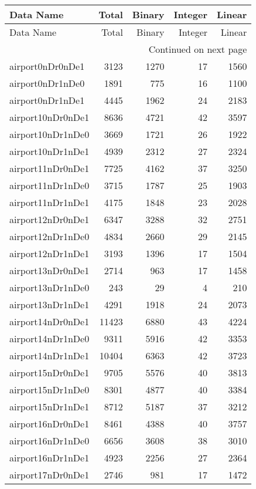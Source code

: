 
\begin{longtable}{lrrrr}
\toprule
Data Name & Total & Binary & Integer & Linear \\
\midrule
\endfirsthead
\toprule
Data Name & Total & Binary & Integer & Linear \\
\midrule
\endhead
\midrule
\multicolumn{5}{r}{Continued on next page} \\
\midrule
\endfoot
\bottomrule
\endlastfoot
airport0nDr0nDe1 & 3123 & 1270 & 17 & 1560 \\
airport0nDr1nDe0 & 1891 & 775 & 16 & 1100 \\
airport0nDr1nDe1 & 4445 & 1962 & 24 & 2183 \\
airport10nDr0nDe1 & 8636 & 4721 & 42 & 3597 \\
airport10nDr1nDe0 & 3669 & 1721 & 26 & 1922 \\
airport10nDr1nDe1 & 4939 & 2312 & 27 & 2324 \\
airport11nDr0nDe1 & 7725 & 4162 & 37 & 3250 \\
airport11nDr1nDe0 & 3715 & 1787 & 25 & 1903 \\
airport11nDr1nDe1 & 4175 & 1848 & 23 & 2028 \\
airport12nDr0nDe1 & 6347 & 3288 & 32 & 2751 \\
airport12nDr1nDe0 & 4834 & 2660 & 29 & 2145 \\
airport12nDr1nDe1 & 3193 & 1396 & 17 & 1504 \\
airport13nDr0nDe1 & 2714 & 963 & 17 & 1458 \\
airport13nDr1nDe0 & 243 & 29 & 4 & 210 \\
airport13nDr1nDe1 & 4291 & 1918 & 24 & 2073 \\
airport14nDr0nDe1 & 11423 & 6880 & 43 & 4224 \\
airport14nDr1nDe0 & 9311 & 5916 & 42 & 3353 \\
airport14nDr1nDe1 & 10404 & 6363 & 42 & 3723 \\
airport15nDr0nDe1 & 9705 & 5576 & 40 & 3813 \\
airport15nDr1nDe0 & 8301 & 4877 & 40 & 3384 \\
airport15nDr1nDe1 & 8712 & 5187 & 37 & 3212 \\
airport16nDr0nDe1 & 8461 & 4388 & 40 & 3757 \\
airport16nDr1nDe0 & 6656 & 3608 & 38 & 3010 \\
airport16nDr1nDe1 & 4923 & 2256 & 27 & 2364 \\
airport17nDr0nDe1 & 2746 & 981 & 17 & 1472 \\

\end{longtable}
